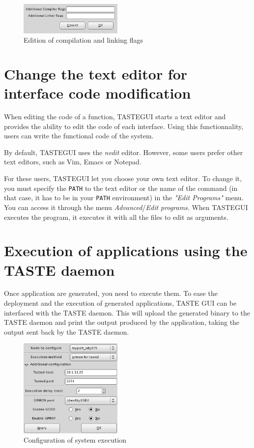 \documentclass[11pt]{book}
\begin{document}
\begin{figure}[!h]
\centering
\includegraphics[width=0.45\textwidth]{imgs/tastegui-compilation-flags}
\caption{Edition of compilation and linking flags}
\label{tastegui-compilation-flags}
\end{figure}


   \section{Change the text editor for interface code modification}
   When editing the code of a function, TASTEGUI starts a text editor and
   provides the ability to edit the code of each interface. Using this
   functionnality, users can write the functional code of the system.

   By default, TASTEGUI uses the \textit{nedit} editor. 
   However, some users prefer other text editors, such as Vim, Emacs or Notepad.

   For these users, TASTEGUI let you choose your own text editor. To change it,
   you must specify the \texttt{PATH} to the text editor or the name of the
   command (in that case, it has to be in your \texttt{PATH} environment) in the
   \textit{"Edit Programs"} menu. You can access it through the menu
   \textit{Advanced}/\textit{Edit programs}. When TASTEGUI executes the program,
   it executes it with all the files to edit as arguments.

   \section{Execution of applications using the TASTE daemon}
   \label{tastegui-tasted}
   Once application are generated, you need to execute them. To ease the
   deployment and the execution of generated applications, TASTE GUI can be
   interfaced with the TASTE daemon. This will upload the generated binary to
   the TASTE daemon and print the output produced by the application, taking the
   output sent back by the TASTE daemon.

\begin{figure}[!h]
\centering
\includegraphics[width=0.45\textwidth]{imgs/tastegui-main-codegen-conf}
\caption{Configuration of system execution}
\label{tastegui-code-generation-conf}
\end{figure}
\end{document}

